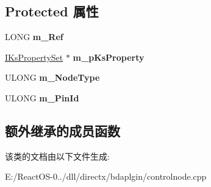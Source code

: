 \subsection*{Protected 属性}
\begin{DoxyCompactItemize}
\item 
\mbox{\label{class_c_control_node_ad800fbe437495749fdfc150b897fa4bb}} 
L\+O\+NG {\bfseries m\+\_\+\+Ref}
\item 
\mbox{\label{class_c_control_node_a84a4ee1b9b7cee005c0c329a1896dc38}} 
\hyperlink{interface_i_ks_property_set}{I\+Ks\+Property\+Set} $\ast$ {\bfseries m\+\_\+p\+Ks\+Property}
\item 
\mbox{\label{class_c_control_node_a0a494092eb5de94ac664884dd248331e}} 
U\+L\+O\+NG {\bfseries m\+\_\+\+Node\+Type}
\item 
\mbox{\label{class_c_control_node_a8eec8ed6eb4cb4b0d5ee6d6a46f01bdd}} 
U\+L\+O\+NG {\bfseries m\+\_\+\+Pin\+Id}
\end{DoxyCompactItemize}
\subsection*{额外继承的成员函数}


该类的文档由以下文件生成\+:\begin{DoxyCompactItemize}
\item 
E\+:/\+React\+O\+S-\/0../dll/directx/bdaplgin/controlnode.\+cpp\end{DoxyCompactItemize}
